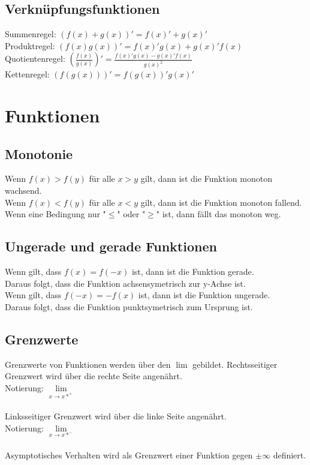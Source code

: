 \documentclass[a4paper,landscape, 11pt]{article}
\newcommand{\limFromTo}[2]{ \lim\limits_{#2 \rightarrow #1}}
\begin{document}
\begin{multicols}{5}
\begin{small}
      \subsection{Verknüpfungsfunktionen}
      			Summenregel: $(f(x) + g(x))' = f(x)' + g(x)' $ \\ 
      			Produktregel: $(f(x)g(x))' = f(x)'g(x)+g(x)'f(x) $ \\
      			Quotientenregel: $(\frac{f(x)}{g(x)})' = \frac{f(x)'g(x)-g(x)'f(x)}{g(x)^2}$ \\
      			Kettenregel: 
      			$(f(g(x)))' = f(g(x))'g(x)'$ \\
     \section{Funktionen}
             \subsection{Monotonie}
                 Wenn $f(x) > f(y)$ für alle $x > y$ gilt, dann ist die Funktion monoton wachsend. \\
                 Wenn $f(x) < f(y)$ für alle $x < y$ gilt, dann ist die Funktion monoton fallend. \\
                 Wenn eine Bedingung nur "$\le$" oder "$\ge$" ist, dann fällt das monoton weg.
                 
             \subsection{Ungerade und gerade Funktionen}
                 Wenn gilt, dass $f(x) = f(-x)$ ist, dann ist die Funktion gerade. \\
                 Daraus folgt, dass die Funktion achsensymetrisch zur y-Achse ist.\\
                 Wenn gilt, dass $f(-x) = -f(x)$ ist, dann ist die Funktion ungerade.\\
                 Daraus folgt, dass die Funktion punktsymetrisch zum Ursprung ist.
              
              \subsection{Grenzwerte}
                  Grenzwerte von Funktionen werden über den $\lim$ gebildet.
                  Rechtsseitiger Grenzwert wird über die rechte Seite angenährt. \\
                  Notierung: $\limFromTo{x*^+}{x}$ \\ 
                  \\
                  Linksseitiger Grenzwert wird über die linke Seite angenährt. \\
                  Notierung: $\limFromTo{x*^-}{x}$ \\ 
                  \\
                  Asymptotisches Verhalten wird als Grenzwert einer Funktion gegen $\pm \infty$ definiert.

\end{small}
\end{multicols}
\end{document}
